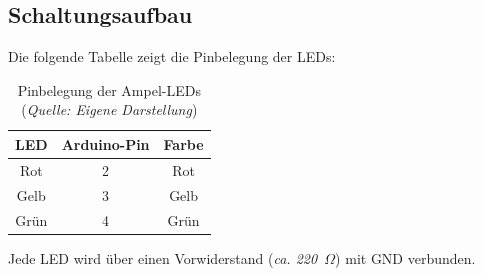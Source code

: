 \subsection{Schaltungsaufbau}
Die folgende Tabelle zeigt die Pinbelegung der LEDs:
\begin{table}[h]
\centering
\begin{tabular}{c|c|c}
\toprule
\textbf{LED} & \textbf{Arduino-Pin} & \textbf{Farbe} \\
\midrule
Rot   & 2 & Rot \\
Gelb  & 3 & Gelb \\
Grün  & 4 & Grün \\
\bottomrule
\end{tabular}
\caption{Pinbelegung der Ampel-LEDs (\textit{Quelle: Eigene Darstellung})}
\label{tab:ampel_pins}
\end{table}
Jede LED wird über einen Vorwiderstand (\textit{ca. 220~$\Omega$}) mit GND verbunden.

